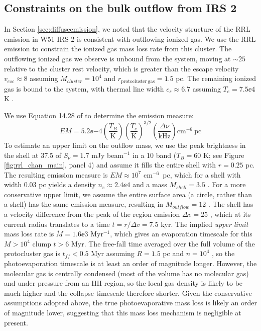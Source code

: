 \subsection{Constraints on the bulk outflow from IRS 2}
\label{sec:irs2outflow}
In Section \ref{sec:diffuseemission}, we noted that the velocity structure of
the RRL emission in W51 IRS 2 is consistent with outflowing ionized gas.  We use
the RRL emission to constrain the ionized gas mass loss rate from this cluster.
The outflowing ionized gas we observe is unbound from the system, moving at
$\sim25$ \kms relative to the cluster rest velocity, which is greater than the
escape velocity $v_{esc}\approx8$ \kms assuming $M_{cluster}=10^4$ \msun and
$r_{\mathrm{protocluster~gas}}=1.5$ pc.  The remaining ionized gas is bound to the system, with
thermal line width $c_s\approx6.7$ \kms assuming $T_e=7.5\ee{4}$ K \citep{Ginsburg2015a}.

We use Equation 14.28 of \citet{Wilson2009a} to determine the emission measure:
\begin{equation}
    EM = 5.2\ee{-4} 
    \left(\frac{T_B}{\mathrm{K}}\right)
    \left(\frac{T_e}{\mathrm{K}}\right)^{3/2} \left(\frac{\Delta
    \nu}{\mathrm{kHz}}\right) \mathrm{cm}^{-6}\mathrm{~pc}
\end{equation}
To estimate an upper limit on the outflow mass, we use the peak brightness in the shell at 37.5
\kms of $S_\nu=1.7$ mJy beam$^{-1}$ in a 10 \kms band ($T_B=60$ K;
 see Figure
\ref{fig:rrl_chan_main}, panel 4) and assume it fills the entire shell with
$r=0.25$ pc.  The resulting emission measure is $EM\approx10^7$ cm$^{-6}$~pc,
which for a shell with width 0.03 pc yields a density $n_e\approx2.4\ee{4}$
\percc and a mass $M_{shell}=3.5$ \msun.  For a more conservative upper limit,
we assume the entire surface area (a circle, rather than a shell) has the same
emission measure, resulting in $M_{outflow}=12$ \msun.  The shell has a velocity
difference from the peak of the \hii region emission $\Delta v=25$ \kms, which
at its current radius translates to a time $t = r / \Delta v = 7.5$ kyr.
The implied \emph{upper limit} mass loss rate is $\dot{M} = 1.6\ee{3}$ \msun
Myr$^{-1}$, which gives an evaporation timescale for this $M>10^4$ \msun
clump $t>6$ Myr.  The free-fall time averaged over the full volume of the protocluster gas is $t_{ff} < 0.5$ Myr
assuming $R=1.5$ pc and $n=10^4$ \percc, so the photoevaporation timescale is
at least an order of magnitude longer.  However, the molecular gas is centrally
condensed (most of the volume has no molecular gas) and under pressure from an
HII region, so the local gas density is likely to be much higher and the
collapse timescale therefore shorter.
Given the conservative assumptions adopted above, the true photoevaporative
mass loss is likely an order of magnitude lower, suggesting that this mass loss
mechanism is negligible at present.


